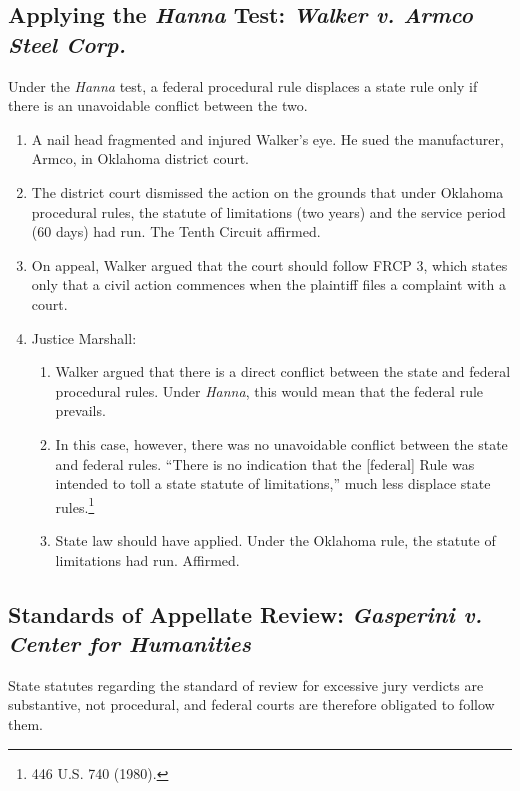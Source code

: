 \subsection{Applying the \emph{Hanna} Test: \emph{Walker v. Armco Steel Corp.}}

Under the \emph{Hanna} test, a federal procedural rule displaces a state rule 
only if there is an unavoidable conflict between the two.

\begin{enumerate}
    \item A nail head fragmented and injured Walker's eye. He sued the 
    manufacturer, Armco, in Oklahoma district court.
    \item The district court dismissed the action on the grounds that under 
    Oklahoma procedural rules, the statute of limitations (two years) and the 
    service period (60 days) had run. The Tenth Circuit affirmed.
    \item On appeal, Walker argued that the court should follow FRCP 3, which 
    states only that a civil action commences when the plaintiff files a 
    complaint with a court.
    \item Justice Marshall:
    \begin{enumerate}
        \item Walker argued that there is a direct conflict between the state 
        and federal procedural rules. Under \emph{Hanna}, this would mean that 
        the federal rule prevails.
        \item In this case, however, there was no unavoidable conflict between 
        the state and federal rules. ``There is no indication that the 
        [federal] Rule was intended to toll a state statute of limitations,'' 
        much less displace state rules.\footnote{446 U.S. 740 (1980).}
        \item State law should have applied. Under the Oklahoma rule, the 
        statute of limitations had run. Affirmed.
    \end{enumerate}
\end{enumerate}

\subsection{Standards of Appellate Review: \emph{Gasperini v. Center for 
Humanities}}

State statutes regarding the standard of review for excessive jury verdicts 
are substantive, not procedural, and federal courts are therefore obligated to 
follow them.

